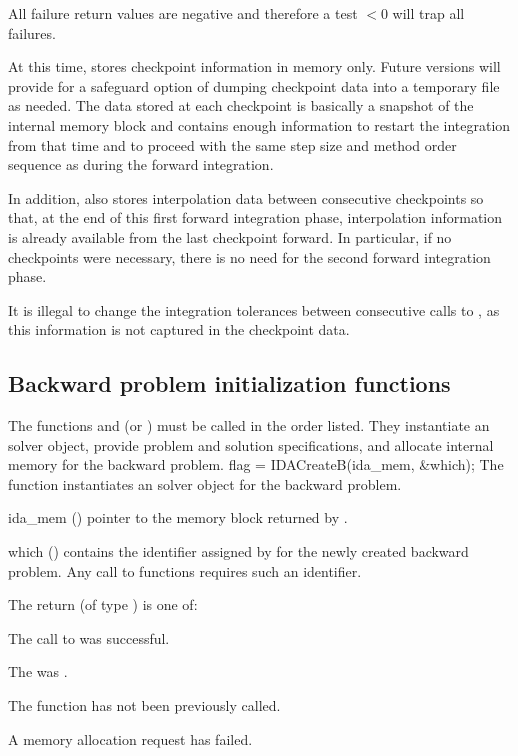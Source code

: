 {
  All failure return values are negative and therefore a test $< 0$
  will trap all  failures.

  At this time,  stores checkpoint information in memory
  only. Future versions will provide for a safeguard option of dumping checkpoint
  data into a temporary file as needed. The data stored at each checkpoint is basically
  a snapshot of the {\idas} internal memory block and contains enough information
  to restart the integration from that time and to proceed with the same step size and
  method order sequence as during the forward integration.

  In addition,  also stores interpolation data between consecutive checkpoints
  so that, at the end of this first forward integration phase, interpolation information
  is already available from the last checkpoint forward. In particular,
  if no checkpoints were necessary, there is no need for the second forward integration phase.

  {\warn}It is illegal to change the integration tolerances between consecutive calls
  to , as this information is not captured in the checkpoint data.
}

\subsection{Backward problem initialization functions}
\label{sss:idainitb}

The functions  and  (or ) must be
called in the order listed. They instantiate an {\idas} solver object, provide problem
and solution specifications, and allocate internal memory for the backward problem.
{
  flag = IDACreateB(ida\_mem, \&which);
}
{
  The function  instantiates an {\idas} solver object for the
  backward problem.
}
{
  \begin{args}
  \item[ida\_mem] ()
    pointer to the {\idas} memory block returned by .
  \item[which] ()
    contains the identifier assigned by {\idas} for the newly created backward
    problem. Any call to  functions requires such an identifier.
  \end{args}
}
{
   The return  (of type ) is one of:
   \begin{args}
   \item[\Id{IDA\_SUCCESS}]
     The call to  was successful.
   \item[\Id{IDA\_MEM\_NULL}]
     The  was .
   \item[\Id{IDA\_NO\_ADJ}]
     The function  has not been previously called.
   \item[\Id{IDA\_MEM\_FAIL}]
     A memory allocation request has failed.
   \end{args}
}
{}


